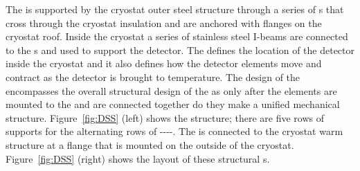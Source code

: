 The  is supported by the
cryostat outer steel structure through a series of \fdth{}s that cross through the cryostat insulation and are anchored with flanges on
the cryostat roof. 
Inside the cryostat a series of stainless steel I-beams are connected to the \fdth{}s and used to support the
detector. 
The  defines the location of the detector inside the cryostat and it also defines how the detector elements move and contract as the detector is brought to  temperature. 
The design of the  encompasses the overall
structural design of the  as only after the elements are mounted to the  and are connected together do they make a unified mechanical structure. 
Figure~\ref{fig:DSS} (left) shows the  structure; there are
five rows of supports for the alternating rows of
----.  
The  is connected to the cryostat warm structure at a flange that is mounted on the outside of the cryostat.  
Figure~\ref{fig:DSS} (right)
shows the layout of these structural \fdth{}s.

